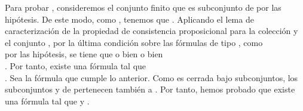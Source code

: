 \begin{isabellebody}
\begin{isamarkuptext}
\begin{demostracion}
  Para probar \isa{{\isasymone}{\isacharparenright}}, consideremos el conjunto finito  que es subconjunto de  por las 
  hipótesis. De este modo, como , tenemos que . Aplicando el lema de 
  caracterización de la propiedad de consistencia proposicional para la colección  y el conjunto 
  , por la última condición sobre las fórmulas de tipo \isa{{\isasymbeta}}, como\\  por las 
  hipótesis, se tiene que o bien  o bien\\ . Por tanto, 
  existe una fórmula  tal que\\ . Sea  la fórmula que cumple lo 
  anterior. Como  es cerrada bajo subconjuntos, los subconjuntos  y  de 
   pertenecen también a . Por tanto, hemos probado que existe una fórmula 
   tal que  y .


\end{demostracion}
\end{isamarkuptext}
\end{isabellebody}
